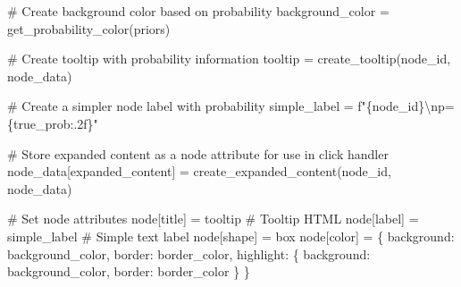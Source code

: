 \documentclass[
  11pt,
  letterpaper,
]{book}
\newenvironment{Shaded}{\begin{snugshade}}{\end{snugshade}}
\newcommand{\CharTok}[1]{\textcolor[rgb]{0.13,0.47,0.30}{#1}}
\newcommand{\CommentTok}[1]{\textcolor[rgb]{0.37,0.37,0.37}{#1}}
\newcommand{\NormalTok}[1]{\textcolor[rgb]{0.00,0.23,0.31}{#1}}
\newcommand{\OperatorTok}[1]{\textcolor[rgb]{0.37,0.37,0.37}{#1}}
\newcommand{\SpecialCharTok}[1]{\textcolor[rgb]{0.37,0.37,0.37}{#1}}
\newcommand{\SpecialStringTok}[1]{\textcolor[rgb]{0.13,0.47,0.30}{#1}}
\newcommand{\StringTok}[1]{\textcolor[rgb]{0.13,0.47,0.30}{#1}}
\begin{document}
\begin{Shaded}
\begin{Highlighting}[]
        \CommentTok{\# Create background color based on probability}
\NormalTok{        background\_color }\OperatorTok{=}\NormalTok{ get\_probability\_color(priors)}

        \CommentTok{\# Create tooltip with probability information}
\NormalTok{        tooltip }\OperatorTok{=}\NormalTok{ create\_tooltip(node\_id, node\_data)}

        \CommentTok{\# Create a simpler node label with probability}
\NormalTok{        simple\_label }\OperatorTok{=} \SpecialStringTok{f"}\SpecialCharTok{\{}\NormalTok{node\_id}\SpecialCharTok{\}}\CharTok{\textbackslash{}n}\SpecialStringTok{p=}\SpecialCharTok{\{}\NormalTok{true\_prob}\SpecialCharTok{:.2f\}}\SpecialStringTok{"}

        \CommentTok{\# Store expanded content as a node attribute for use in click handler}
\NormalTok{        node\_data[}\StringTok{\textquotesingle{}expanded\_content\textquotesingle{}}\NormalTok{] }\OperatorTok{=}\NormalTok{ create\_expanded\_content(node\_id, node\_data)}

        \CommentTok{\# Set node attributes}
\NormalTok{        node[}\StringTok{\textquotesingle{}title\textquotesingle{}}\NormalTok{] }\OperatorTok{=}\NormalTok{ tooltip  }\CommentTok{\# Tooltip HTML}
\NormalTok{        node[}\StringTok{\textquotesingle{}label\textquotesingle{}}\NormalTok{] }\OperatorTok{=}\NormalTok{ simple\_label  }\CommentTok{\# Simple text label}
\NormalTok{        node[}\StringTok{\textquotesingle{}shape\textquotesingle{}}\NormalTok{] }\OperatorTok{=} \StringTok{\textquotesingle{}box\textquotesingle{}}
\NormalTok{        node[}\StringTok{\textquotesingle{}color\textquotesingle{}}\NormalTok{] }\OperatorTok{=}\NormalTok{ \{}
            \StringTok{\textquotesingle{}background\textquotesingle{}}\NormalTok{: background\_color,}
            \StringTok{\textquotesingle{}border\textquotesingle{}}\NormalTok{: border\_color,}
            \StringTok{\textquotesingle{}highlight\textquotesingle{}}\NormalTok{: \{}
                \StringTok{\textquotesingle{}background\textquotesingle{}}\NormalTok{: background\_color,}
                \StringTok{\textquotesingle{}border\textquotesingle{}}\NormalTok{: border\_color}
\NormalTok{            \}}
\NormalTok{        \}}


\end{Highlighting}
\end{Shaded}
\end{document}
